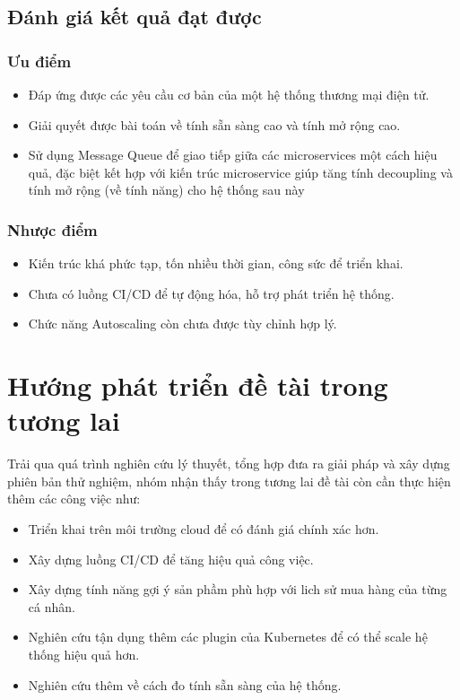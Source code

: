 \subsection{Đánh giá kết quả đạt được}
\subsubsection{Ưu điểm}
\begin{itemize}
    \item Đáp ứng được các yêu cầu cơ bản của một hệ thống thương mại điện tử.
    \item Giải quyết được bài toán về tính sẵn sàng cao và tính mở rộng cao.
    \item Sử dụng Message Queue để giao tiếp giữa các microservices một cách hiệu quả, đặc biệt kết hợp với kiến trúc microservice giúp tăng tính decoupling và tính mở rộng (về tính năng) cho hệ thống sau này
\end{itemize}
\subsubsection{Nhược điểm}
\begin{itemize}
    \item Kiến trúc khá phức tạp, tốn nhiều thời gian, công sức để triển khai.
    \item Chưa có luồng CI/CD để tự động hóa, hỗ trợ phát triển hệ thống.
    \item Chức năng Autoscaling còn chưa được tùy chỉnh hợp lý.
\end{itemize}
\section{Hướng phát triển đề tài trong tương lai}
\noindent Trải qua quá trình nghiên cứu lý thuyết, tổng hợp đưa ra giải pháp và xây dựng phiên bản thử nghiệm, nhóm nhận thấy trong tương lai đề tài còn cần thực hiện thêm các công việc như:
\begin{itemize}
    \item Triển khai trên môi trường cloud để có đánh giá chính xác hơn.
    \item Xây dựng luồng CI/CD để tăng hiệu quả công việc.
    \item Xây dựng tính năng gợi ý sản phầm phù hợp với lich sử mua hàng của từng cá nhân.
    \item Nghiên cứu tận dụng thêm các plugin của Kubernetes để có thể scale hệ thống hiệu quả hơn.
    \item Nghiên cứu thêm về cách đo tính sẵn sàng của hệ thống.
\end{itemize}
